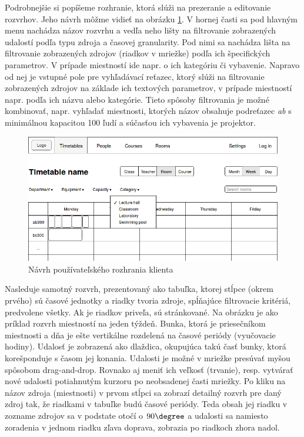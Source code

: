 Podrobnejšie si popíšeme rozhranie, ktorá slúži na prezeranie a editovanie
rozvrhov. Jeho návrh môžme vidieť na obrázku \ref{fig:client_design}. V hornej
časti sa pod hlavným menu nachádza názov rozvrhu a vedľa neho lišty na
filtrovanie zobrazených udalostí podľa typu zdroja a časovej granularity. Pod
nimi sa nachádza lišta na filtrovanie zobrazených zdrojov (riadkov v mriežke)
podľa ich špecifických parametrov. V prípade miestností ide napr. o ich
kategóriu či vybavenie. Napravo od nej je vstupné pole pre vyhľadávací reťazec,
ktorý slúži na filtrovanie zobrazených zdrojov na základe ich textových
parametrov, v prípade miestností napr. podľa ich názvu alebo kategórie. Tieto
spôsoby filtrovania je možné kombinovať, napr. vyhľadať miestnosti, ktorých
názov obsahuje podreťazec \emph{ab} s minimálnou kapacitou 100 ľudí a súčasťou
ich vybavenia je projektor.

\begin{figure}
  \centering
  \includegraphics[width=\textwidth]{figures/client-design.png}
  \caption{\label{fig:client_design} Návrh používateľského rozhrania klienta}
\end{figure}

Nasleduje samotný rozvrh, prezentovaný ako tabuľka, ktorej stĺpce (okrem prvého)
sú časové jednotky a riadky tvoria zdroje, spĺňajúce filtrovacie kritériá,
predvolene všetky. Ak je riadkov priveľa, sú stránkované. Na obrázku je ako
príklad rozvrh miestností na jeden týždeň. Bunka, ktorá je priesečníkom
miestnosti a dňa je ešte vertikálne rozdelená na časové periódy (vyučovacie
hodiny). Udalosť je zobrazená ako dlaždica, okupujúca takú časť bunky, ktorá
korešponduje s časom jej konania. Udalosti je možné v mriežke presúvať myšou
spôsobom drag-and-drop. Rovnako aj meniť ich veľkosť (trvanie), resp. vytvárať
nové udalosti potiahnutým kurzoru po neobsadenej časti mriežky. Po kliku na
názov zdroja (miestnosti) v prvom stĺpci sa zobrazí detailný rozvrh pre daný
zdroj tak, že riadkami v tabuľke budú časové periódy. Teda obsah jej riadku v
zozname zdrojov sa v podstate otočí o $90\degree$ a udalosti sa namiesto
zoradenia v jednom riadku zľava doprava, zobrazia po riadkoch zhora nadol.

